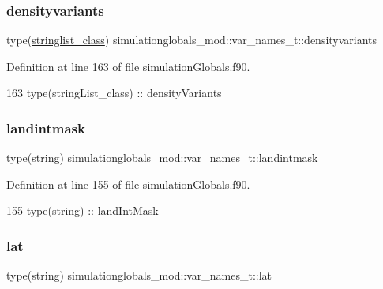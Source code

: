 \subsubsection{\texorpdfstring{densityvariants}{densityvariants}}
{\footnotesize\ttfamily type(\mbox{\hyperlink{structsimulationglobals__mod_1_1stringlist__class}{stringlist\+\_\+class}}) simulationglobals\+\_\+mod\+::var\+\_\+names\+\_\+t\+::densityvariants\hspace{0.3cm}{\ttfamily [private]}}



Definition at line 163 of file simulation\+Globals.\+f90.


\begin{DoxyCode}
163         \textcolor{keywordtype}{type}(stringList\_class) :: densityVariants
\end{DoxyCode}
\mbox{\label{structsimulationglobals__mod_1_1var__names__t_a200a4d2d418449d20df4d5d61eaef041}} 
\subsubsection{\texorpdfstring{landintmask}{landintmask}}
{\footnotesize\ttfamily type(string) simulationglobals\+\_\+mod\+::var\+\_\+names\+\_\+t\+::landintmask\hspace{0.3cm}{\ttfamily [private]}}



Definition at line 155 of file simulation\+Globals.\+f90.


\begin{DoxyCode}
155         \textcolor{keywordtype}{type}(string) :: landIntMask
\end{DoxyCode}
\mbox{\label{structsimulationglobals__mod_1_1var__names__t_aab90536922d15a1684cb7d0cfce99e95}} 
\subsubsection{\texorpdfstring{lat}{lat}}
{\footnotesize\ttfamily type(string) simulationglobals\+\_\+mod\+::var\+\_\+names\+\_\+t\+::lat\hspace{0.3cm}{\ttfamily [private]}}



